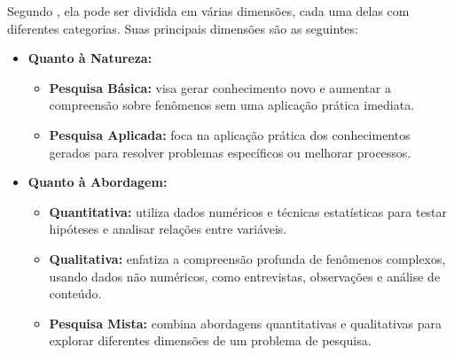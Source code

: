 Segundo , ela pode ser dividida em várias dimensões, cada uma delas com diferentes categorias. Suas principais dimensões são as seguintes:
\begin{itemize}[nosep, leftmargin=2.3cm]
    \item \textbf{Quanto à Natureza:}
        \begin{itemize}[nosep]
            \item \textbf{Pesquisa Básica:} visa gerar conhecimento novo e aumentar a compreensão sobre fenômenos sem uma aplicação prática imediata.
            \item \textbf{Pesquisa Aplicada:} foca na aplicação prática dos conhecimentos gerados para resolver problemas específicos ou melhorar processos.
        \end{itemize}
    \item \textbf{Quanto à Abordagem:}
        \begin{itemize}[nosep]
            \item \textbf{Quantitativa:} utiliza dados numéricos e técnicas estatísticas para testar hipóteses e analisar relações entre variáveis.
            \item \textbf{Qualitativa:} enfatiza a compreensão profunda de fenômenos complexos, usando dados não numéricos, como entrevistas, observações e análise de conteúdo.
            \item \textbf{Pesquisa Mista:} combina abordagens quantitativas e qualitativas para explorar diferentes dimensões de um problema de pesquisa.
        \end{itemize}

\newpage


\end{itemize}
